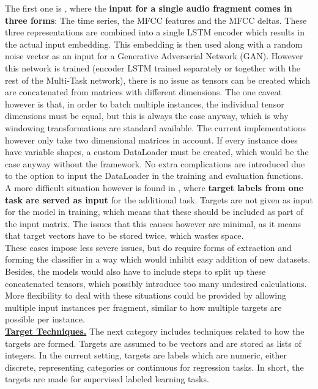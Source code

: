 The first one is \cite{fernando2020temporarily}, where the \textbf{input for a single audio fragment comes in three forms}: The time series, the MFCC features and the MFCC deltas.  These three representations are combined into a single LSTM encoder which results in the actual input embedding. This embedding is then used along with a random noise vector as an input for a Generative Adverserial Network (GAN). However this network is trained (encoder LSTM trained separately or together with the rest of the Multi-Task network), there is no issue as tensors can be created which are concatenated from matrices with different dimensions. The one caveat however is that, in order to batch multiple instances, the individual tensor dimensions must be equal, but this is always the case anyway, which is why windowing transformations are standard available. The current implementations however only take two dimensional matrices in account. If every instance does have variable shapes, a custom DataLoader must be created, which would be the case anyway without the framework. No extra complications are introduced due to the option to input the DataLoader in the training and evaluation functions.\\

A more difficult situation however is found in \cite{komatsu2020scene}, where \textbf{target labels from one task are served as input} for the additional task. Targets are not given as input for the model in training, which means that these should be included as part of the input matrix. The issues that this causes however are minimal, as it means that target vectors have to be stored twice, which wastes space. \\

These cases impose less severe issues, but do require forms of extraction and forming the classifier in a way which would inhibit easy addition of new datasets. Besides, the models would also have to include steps to split up these concatenated tensors, which possibly introduce too many undesired calculations. More flexibility to deal with these situations could be provided by allowing multiple input instances per fragment, similar to how multiple targets are possible per instance. \\

\underline{\textbf{Target Techniques.}} The next category includes techniques related to how the targets are formed. Targets are assumed to be vectors and are stored as lists of integers. In the current setting, targets are labels which are numeric, either discrete, representing categories or continuous for regression tasks. In short, the targets are made for supervised labeled learning tasks.


